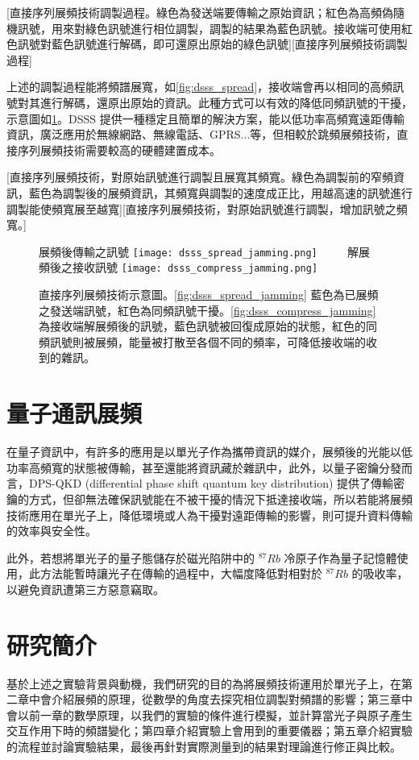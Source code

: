 \documentclass[class=NCU_thesis, crop=false]{standalone}
\begin{document}
[直接序列展頻技術調製過程。綠色為發送端要傳輸之原始資訊；紅色為高頻偽隨機訊號，用來對綠色訊號進行相位調製，調製的結果為藍色訊號。接收端可使用紅色訊號對藍色訊號進行解碼，即可還原出原始的綠色訊號][直接序列展頻技術調製過程]

上述的調製過程能將頻譜展寬，如\cref{fig:dsss_spread}，接收端會再以相同的高頻訊號對其進行解碼，還原出原始的資訊。此種方式可以有效的降低同頻訊號的干擾，示意圖如\cref{fig:dsss}。DSSS 提供一種穩定且簡單的解決方案，能以低功率高頻寬遠距傳輸資訊，廣泛應用於無線網路、無線電話、GPRS...等，但相較於跳頻展頻技術，直接序列展頻技術需要較高的硬體建置成本。

[直接序列展頻技術，對原始訊號進行調製且展寬其頻寬。綠色為調製前的窄頻資訊，藍色為調製後的展頻資訊，其頻寬與調製的速度成正比，用越高速的訊號進行調製能使頻寬展至越寬][直接序列展頻技術，對原始訊號進行調製，增加訊號之頻寬。]

\begin{figure}[!hbt]
    \centering
    \subcaptionbox
        {展頻後傳輸之訊號
        \label{fig:dsss_spread_jamming}}
        {\texttt{[image: dsss\_spread\_jamming.png]}}
    ~~~~
    \subcaptionbox
        {解展頻後之接收訊號
        \label{fig:dsss_compress_jamming}}
        {\texttt{[image: dsss\_compress\_jamming.png]}}
    \caption[直接序列展頻技術示意圖]{直接序列展頻技術示意圖。\cref{fig:dsss_spread_jamming} 藍色為已展頻之發送端訊號，紅色為同頻訊號干擾。\cref{fig:dsss_compress_jamming} 為接收端解展頻後的訊號，藍色訊號被回復成原始的狀態，紅色的同頻訊號則被展頻，能量被打散至各個不同的頻率，可降低接收端的收到的雜訊。}
    \label{fig:dsss}
\end{figure}

\section{量子通訊展頻}
在量子資訊中，有許多的應用是以單光子作為攜帶資訊的媒介，展頻後的光能以低功率高頻寬的狀態被傳輸，甚至還能將資訊藏於雜訊中\cite{belthangady2010hiding}，此外，以量子密鑰分發\cite{RevModPhys.74.145}而言，DPS-QKD (differential phase shift quantum key distribution)\cite{PhysRevLett.89.037902} 提供了傳輸密鑰的方式，但卻無法確保訊號能在不被干擾的情況下抵達接收端，所以若能將展頻技術應用在單光子上，降低環境或人為干擾對遠距傳輸的影響，則可提升資料傳輸的效率與安全性。

此外，若想將單光子的量子態儲存於磁光陷阱中的 $^{87}Rb$ 冷原子作為量子記憶體使用\cite{PhysRevLett.101.120501}，此方法能暫時讓光子在傳輸的過程中，大幅度降低對相對於 $^{87}Rb$ 的吸收率，以避免資訊遭第三方惡意竊取。

\section{研究簡介}
基於上述之實驗背景與動機，我們研究的目的為將展頻技術運用於單光子上，在第二章中會介紹展頻的原理，從數學的角度去探究相位調製對頻譜的影響；第三章中會以前一章的數學原理，以我們的實驗的條件進行模擬，並計算當光子與原子產生交互作用下時的頻譜變化；第四章介紹實驗上會用到的重要儀器；第五章介紹實驗的流程並討論實驗結果，最後再針對實際測量到的結果對理論進行修正與比較。
\end{document}
